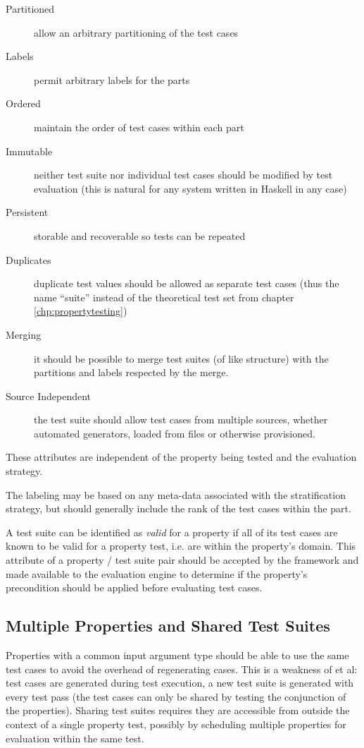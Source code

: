 \begin{description}
\item[Partitioned] allow an arbitrary partitioning of the test cases
\item[Labels] permit arbitrary labels for the parts
\item[Ordered] maintain the order of test cases within each part
\item[Immutable] neither test suite nor individual test cases should be modified by test evaluation
(this is natural for any system written in Haskell in any case)
\item[Persistent] storable and recoverable so tests can be repeated
\item[Duplicates] duplicate test values should be allowed as separate test cases
(thus the name ``suite'' instead of the theoretical test set from chapter \ref{chp:propertytesting})
\item[Merging] it should be possible to merge test suites (of like structure)
with the partitions and labels respected by the merge.
\item[Source Independent] the test suite should allow test cases from multiple sources,
whether automated generators, loaded from files or otherwise provisioned.
\end{description}
\noindent
These attributes are independent of the property being tested and the evaluation strategy.

The labeling may be based on 
any meta-data associated with the stratification strategy,
but should generally include the rank of the test cases within the part.

A test suite can be identified as \emph{valid} for a property if 
all of its test cases are known to be valid for a property test,
i.e. are within the property's domain.
This attribute of a property / test suite pair 
should be accepted by the framework and made available to the evaluation engine
to determine if the property's precondition should be applied before evaluating test cases.


\subsection{Multiple Properties and Shared Test Suites}

Properties with a common input argument type
should be able to use the same test cases to avoid the overhead of regenerating cases.
This is a weakness of \QC et al:
test cases are generated during test execution,
a new test suite is generated with every test pass
(the test cases can only be shared by testing the conjunction of the properties).
Sharing test suites requires they are accessible from outside the context of a single property test,
possibly by scheduling multiple properties for evaluation within the same test.

